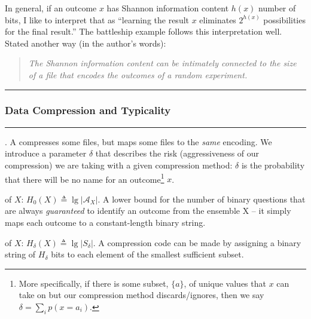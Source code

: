\documentclass[11pt]{article}
\newcommand\myspace[1][]{\vspace{#1\bigskipamount}}
\newcommand\p{\Needspace{10\baselineskip} \noindent}
\newcommand\subsub[1]{\Needspace{15\baselineskip}\hrule\subsubsection{#1}\hrule}
\begin{document}
\p In general, if an outcome $x$ has Shannon information content $h(x)$ number of bits, I like to interpret that as ``learning the result $x$ eliminates $2^{h(x)}$ possibilities for the final result.'' The battleship example follows this interpretation well. Stated another way (in the author's words):
\begin{quote}
	{\itshape The Shannon information content can be intimately connected to the size of a file that encodes the outcomes of a random experiment.}
\end{quote}

\myspace
\subsub{Data Compression and Typicality}
\myspace

\p {}. A  compresses some files, but maps some files to the \textit{same} encoding. We introduce a parameter $\delta$ that describes the risk (aggressiveness of our compression) we are taking with a given compression method: $\delta$ is the probability that there will be no name for an outcome\footnote{More specifically, if there is some subset, $\{a\}$, of unique values that $x$ can take on but our compression method discards/ignores, then we say $\delta = \sum_i p(x = a_i)$.} $x$.


\begin{compactitem}
	\item {} of $X$: $H_0(X) \triangleq \lg |\mathcal{A}_X|$. A lower bound for the number of binary questions that are always \textit{guaranteed} to identify an outcome from the ensemble X -- it simply maps each outcome to a constant-length binary string.
	
	
	\item {} of $X$: $H_{\delta}(X) \triangleq \lg |S_{\delta} |$. A compression code can be made by assigning a binary string of $H_{\delta}$ bits to each element of the smallest sufficient subset. 
\end{compactitem}
\end{document}
